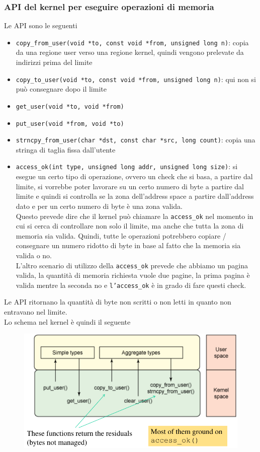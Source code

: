 \documentclass[12pt, oneside]{extbook}
\begin{document}
\subsubsection{API del kernel per eseguire operazioni di memoria}
Le API sono le seguenti
\begin{itemize}
\item \texttt{copy\_from\_user(void *to, const void *from, unsigned long n)}: copia da una regione user verso una regione kernel, quindi vengono prelevate da indirizzi prima del limite
\item \texttt{copy\_to\_user(void *to, const void *from, unsigned long n)}: qui non si può consegnare dopo il limite
\item \texttt{get\_user(void *to, void *from)}
\item \texttt{put\_user(void *from, void *to)}
\item \texttt{strncpy\_from\_user(char *dst, const char *src, long count)}: copia una stringa di taglia fissa dall'utente
\item \texttt{access\_ok(int type, unsigned long addr, unsigned long size)}: si esegue un certo tipo di operazione, ovvero un check che si basa, a partire dal limite, si vorrebbe poter lavorare su un certo numero di byte a partire dal limite e quindi si controlla se la zona dell'address space a partire dall'address dato e per un certo numero di byte è una zona valida.\\Questo prevede dire che il kernel può chiamare la \texttt{access\_ok} nel momento in cui si cerca di controllare non solo il limite, ma anche che tutta la zona di memoria sia valida. Quindi, tutte le operazioni potrebbero copiare / consegnare un numero ridotto di byte in base al fatto che la memoria sia valida o no.\\L'altro scenario di utilizzo della \texttt{access\_ok} prevede che abbiamo un pagina valida, la quantità di memoria richiesta vuole due pagine, la prima pagina è valida mentre la seconda no e \texttt{l'access\_ok} è in grado di fare questi check.
\end{itemize}
Le API ritornano la quantità di byte non scritti o non letti in quanto non entravano nel limite.\\Lo schema nel kernel è quindi il seguente
\begin{figure}[!h]
	\includegraphics[scale=0.4]{immagini/rw_kernel_api.png}
\end{figure}
\end{document}
